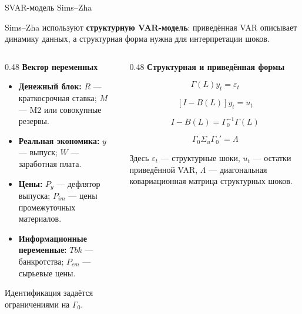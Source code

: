 \begin{frame}[t]{SVAR-модель Sims--Zha}
\small

Sims--Zha используют \textbf{структурную VAR-модель}: приведённая VAR описывает динамику данных, а структурная форма нужна для интерпретации шоков.

\vspace{0.35em}

\begin{columns}[T,onlytextwidth]

\begin{column}{0.48\textwidth}
\textbf{Вектор переменных}

\vspace{0.3em}

\begin{itemize}
\setlength\itemsep{0.32em}
\item \textbf{Денежный блок:} $R$ — краткосрочная ставка; $M$ — M2 или совокупные резервы.
\item \textbf{Реальная экономика:} $y$ — выпуск; $W$ — заработная плата.
\item \textbf{Цены:} $P_y$ — дефлятор выпуска; $P_{im}$ — цены промежуточных материалов.
\item \textbf{Информационные переменные:} $Tbk$ — банкротства; $P_{cm}$ — сырьевые цены.
\end{itemize}

\vspace{0.25em}

\footnotesize
Идентификация задаётся ограничениями на $\Gamma_0$.
\end{column}

\begin{column}{0.48\textwidth}
\textbf{Структурная и приведённая формы}

\vspace{0.25em}

\footnotesize

$$
\Gamma(L)y_t = \varepsilon_t
$$

$$
[I - B(L)]y_t = u_t
$$

$$
I - B(L) = \Gamma_0^{-1}\Gamma(L)
$$

$$
\Gamma_0 \Sigma_u \Gamma_0' = \Lambda
$$

\vspace{0.15em}

Здесь $\varepsilon_t$ — структурные шоки, $u_t$ — остатки приведённой VAR, $\Lambda$ — диагональная ковариационная матрица структурных шоков.
\end{column}

\end{columns}

\end{frame}